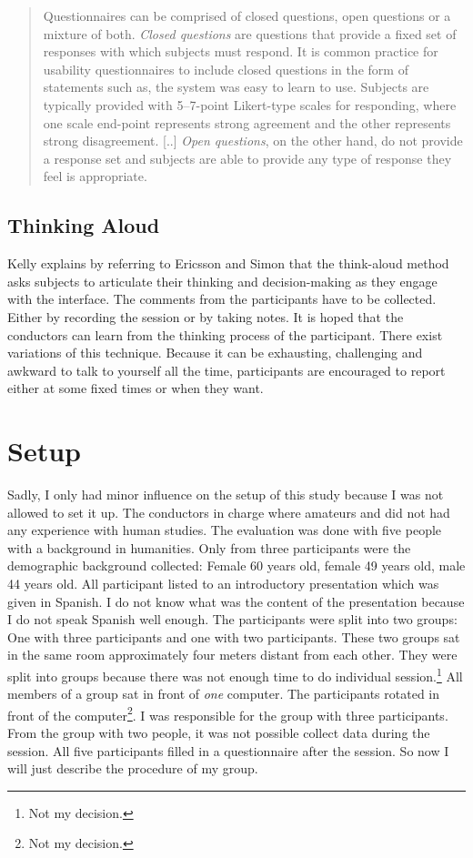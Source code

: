 \documentclass[11pt]{report}
\begin{document}
\begin{quote}
	Questionnaires can be comprised of closed questions, open questions or a mixture of both. \textit{Closed questions} are questions that provide a fixed set of responses with which subjects must respond. It is common practice for usability questionnaires to include closed questions in the form of statements such as, the system was easy to learn to use. Subjects are typically provided with 5–7-point Likert-type scales for responding, where one scale end-point represents strong agreement and the other represents strong disagreement. [..] \textit{Open questions}, on the other hand, do not provide a response set and subjects are able to provide any type of response they feel is appropriate. 
	\end{quote}


\subsection{Thinking Aloud}

Kelly \cite{Kelly2007} explains by referring to Ericsson and Simon \cite{Ericsson1993} that the think-aloud method asks subjects to articulate their thinking and decision-making as they engage with the interface. The comments from the participants have to be collected. Either by recording the session or by taking notes. It is hoped that the conductors can learn from the thinking process of the participant. There exist variations of this technique. Because it can be exhausting, challenging and awkward to talk to yourself all the time, participants are encouraged to report either at some fixed times or when they want.

\section{Setup}

Sadly, I only had minor influence on the setup of this study because I was not allowed to set it up. The conductors in charge where amateurs and did not had any experience with human studies. The evaluation was done with five people with a background in humanities. Only from three participants were the demographic background collected: Female 60 years old, female 49 years old, male 44 years old. All participant listed to an introductory presentation which was given in Spanish. I do not know what was the content of the presentation because I do not speak Spanish well enough. The participants were split into two groups: One with three participants and one with two participants. These two groups sat in the same room approximately four meters distant from each other. They were split into groups because there was not enough time to do individual session.\footnote{Not my decision.} All members of a group sat in front of \textit{one} computer. The participants rotated in front of the computer\footnote{Not my decision.}. I was responsible for the group with three participants. From the group with two people, it was not possible collect data during the session. All five participants filled in a questionnaire after the session. So now I will just describe the procedure of my group. \\
\end{document}
